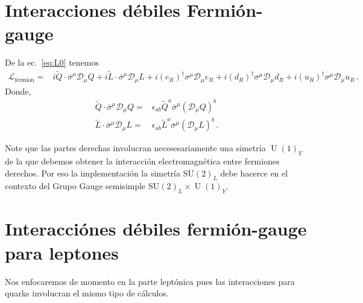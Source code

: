 \section{Interacciones débiles Fermión-gauge }

\begin{frame}
De la ec.~\eqref{eq:L0} tenemos
\begin{align}
  \label{eq:lfermion}
  \mathcal{L}_{\text{fermion}}=&i \widetilde{Q}\cdot\overline{\sigma}^\mu\mathcal{D}_\mu Q+i \widetilde{L}\cdot\overline{\sigma}^\mu\mathcal{D}_\mu L+
i(e_R)^{\dagger}\sigma^\mu\mathcal{D}_\mu {e_R}+i(d_R)^{\dagger}\sigma^\mu\mathcal{D}_\mu {d_R}+i(u_R)^{\dagger}\sigma^\mu\mathcal{D}_\mu {u_R}\,.
\end{align}
Donde, 
\begin{align}
  \widetilde{Q}\cdot\overline{\sigma}^\mu\mathcal{D}_\mu Q=&
  \epsilon_{ab}\widetilde{Q}^a\overline{\sigma}^\mu \left( \mathcal{D}_\mu Q \right)^b \nonumber\\
  \widetilde{L}\cdot\overline{\sigma}^\mu\mathcal{D}_\mu L=&
  \epsilon_{ab}\widetilde{L}^a\overline{\sigma}^\mu \left( \mathcal{D}_\mu L \right)^b\,.
\end{align}

Note que las partes derechas involucran necesesariamente una simetría $\operatorname{U}(1)_Y$ de la que debemos obtener la interacción electromagnética entre fermiones derechos. Por eso la implementación la simetría $\operatorname{SU(2)}_L$ debe hacerce en el contexto del Grupo Gauge semisimple $\operatorname{SU(2)}_L\times \operatorname{U}(1)_Y$.

\section{Interacciónes débiles fermión-gauge para leptones}

Nos enfocaremos de momento en la parte leptónica pues las interacciones para quarks involucran el mismo tipo de cálculos.


\end{frame}
